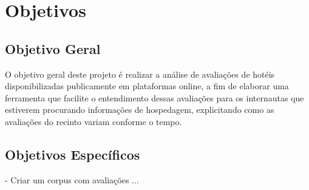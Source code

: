 \chapter{Objetivos}\label{cap:objetivos}



\section{Objetivo Geral}

O objetivo geral deste projeto é realizar a análise de avaliações de hotéis disponibilizadas publicamente em plataformas online, a fim de elaborar uma ferramenta que facilite o entendimento dessas avaliações para os internautas que estiverem procurando informações de hospedagem, explicitando como as avaliações do recinto variam conforme o tempo.

\section{Objetivos Específicos}

- Criar um corpus com avaliações ...


